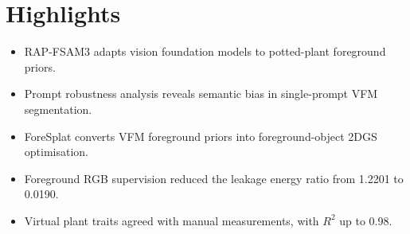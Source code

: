 \documentclass[a4paper,12pt]{article}
\begin{document}
\section*{Highlights}

\begin{itemize}
\item RAP-FSAM3 adapts vision foundation models to potted-plant foreground priors.
\item Prompt robustness analysis reveals semantic bias in single-prompt VFM segmentation.
\item ForeSplat converts VFM foreground priors into foreground-object 2DGS optimisation.
\item Foreground RGB supervision reduced the leakage energy ratio from 1.2201 to 0.0190.
\item Virtual plant traits agreed with manual measurements, with \(R^2\) up to 0.98.
\end{itemize}
\end{document}
